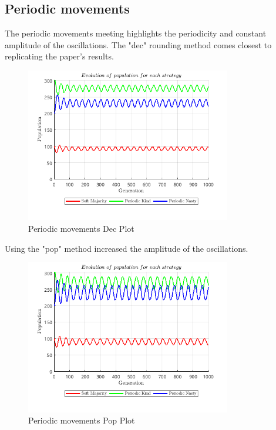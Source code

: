 \subsection{Periodic movements}
The periodic movements meeting highlights the periodicity and constant amplitude of the oscillations. The "dec" rounding method comes closest to replicating the paper's results.
\begin{figure}[H]
    \centering
    \includegraphics[width=0.8\textwidth]{media/meetings/periodic_movements_dec.png}
    \caption{Periodic movements Dec Plot}
\end{figure}
Using the "pop" method increased the amplitude of the oscillations.
\begin{figure}[H]
    \centering
    \includegraphics[width=0.8\textwidth]{media/meetings/periodic_movements_pop.png}
    \caption{Periodic movements Pop Plot}
\end{figure}

